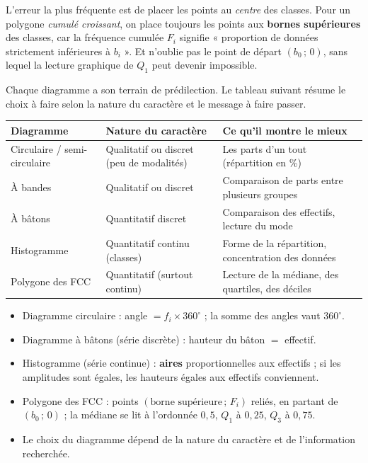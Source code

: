 \documentclass[11pt]{article}
\newcounter{popsec}
\newcounter{popsub}
\newcommand{\courssub}[1]{%
  \stepcounter{popsub}%
  \par\vspace{9pt}\noindent{\popxbold\fontsize{11.5}{13}\selectfont\color{popink}{\color{poporange}\thepopsec.\thepopsub}\hspace{6pt}#1}\par\nopagebreak\vspace{4pt}
}
\begin{document}
\begin{attention}
L'erreur la plus fréquente est de placer les points au \emph{centre} des classes. Pour un polygone \emph{cumulé croissant}, on place toujours les points aux \textbf{bornes supérieures} des classes, car la fréquence cumulée $F_i$ signifie « proportion de données strictement inférieures à $b_i$ ». Et n'oublie pas le point de départ $(b_0\,;\,0)$, sans lequel la lecture graphique de $Q_1$ peut devenir impossible.
\end{attention}

\courssub{Bien choisir son diagramme}

Chaque diagramme a son terrain de prédilection. Le tableau suivant résume le choix à faire selon la nature du caractère et le message à faire passer.

\begin{center}
\begin{tabularx}{\linewidth}{|l|X|X|}\hline
\rowcolor{popblueL} \textbf{Diagramme} & \textbf{Nature du caractère} & \textbf{Ce qu'il montre le mieux} \\\hline
Circulaire / semi-circulaire & Qualitatif ou discret (peu de modalités) & Les parts d'un tout (répartition en \%) \\\hline
À bandes & Qualitatif ou discret & Comparaison de parts entre plusieurs groupes \\\hline
À bâtons & Quantitatif discret & Comparaison des effectifs, lecture du mode \\\hline
Histogramme & Quantitatif continu (classes) & Forme de la répartition, concentration des données \\\hline
Polygone des FCC & Quantitatif (surtout continu) & Lecture de la médiane, des quartiles, des déciles \\\hline
\end{tabularx}
\end{center}

\begin{aretenir}
\begin{itemize}
\item Diagramme circulaire : angle $= f_i \times 360^{\circ}$ ; la somme des angles vaut $360^{\circ}$.
\item Diagramme à bâtons (série discrète) : hauteur du bâton $=$ effectif.
\item Histogramme (série continue) : \textbf{aires} proportionnelles aux effectifs ; si les amplitudes sont égales, les hauteurs égales aux effectifs conviennent.
\item Polygone des FCC : points $(\text{borne supérieure}\,;\,F_i)$ reliés, en partant de $(b_0\,;\,0)$ ; la médiane se lit à l'ordonnée $0{,}5$, $Q_1$ à $0{,}25$, $Q_3$ à $0{,}75$.
\item Le choix du diagramme dépend de la nature du caractère et de l'information recherchée.
\end{itemize}
\end{aretenir}
\end{document}
